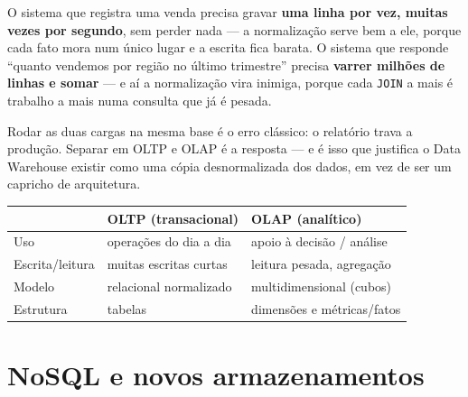 \begin{conceito}
O sistema que registra uma venda precisa gravar \textbf{uma linha por
vez, muitas vezes por segundo}, sem perder nada --- a normalização serve
bem a ele, porque cada fato mora num único lugar e a escrita fica barata.
O sistema que responde “quanto vendemos por região no último trimestre”
precisa \textbf{varrer milhões de linhas e somar} --- e aí a
normalização vira inimiga, porque cada \texttt{JOIN} a mais é trabalho a
mais numa consulta que já é pesada.

Rodar as duas cargas na mesma base é o erro clássico: o relatório trava a
produção. Separar em OLTP e OLAP é a resposta --- e é isso que justifica
o Data Warehouse existir como uma cópia desnormalizada dos dados, em vez
de ser um capricho de arquitetura.

\begin{center}
\begin{tabular}{@{}p{2.6cm}p{4.4cm}p{4.4cm}@{}}
\toprule
& \textbf{OLTP (transacional)} & \textbf{OLAP (analítico)} \\
\midrule
Uso & operações do dia a dia & apoio à decisão / análise \\
Escrita/leitura & muitas escritas curtas & leitura pesada, agregação \\
Modelo & relacional normalizado & multidimensional (cubos) \\
Estrutura & tabelas & dimensões e métricas/fatos \\
\bottomrule
\end{tabular}
\end{center}
\end{conceito}

\section{NoSQL e novos armazenamentos}

